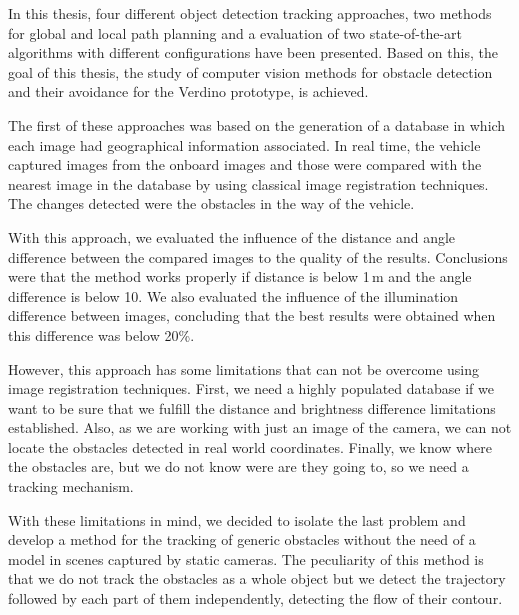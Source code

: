 

In this thesis, four different object detection tracking approaches, two methods for global and local path planning and a evaluation of two state-of-the-art algorithms with different configurations have been presented. Based on this, the goal of this thesis, the study of computer vision methods for obstacle detection and their avoidance for the Verdino prototype, is achieved.

The first of these approaches was based on the generation of a database in which each image had geographical information associated. In real time, the vehicle captured images from the onboard images and those were compared with the nearest image in the database by using classical image registration techniques. The changes detected were the obstacles in the way of the vehicle. 

With this approach, we evaluated the influence of the distance and angle difference between the compared images to the quality of the results. Conclusions were that the method works properly if distance is below 1\,m and the angle difference is below 10\textdegree. We also evaluated the influence of the illumination difference between images, concluding that the best results were obtained when this difference was below 20\%.

However, this approach has some limitations that can not be overcome using image registration techniques. First, we need a highly populated database if we want to be sure that we fulfill the distance and brightness difference limitations established. Also, as we are working with just an image of the camera, we can not locate the obstacles detected in real world coordinates. Finally, we know where the obstacles are, but we do not know were are they going to, so we need a tracking mechanism.

With these limitations in mind, we decided to isolate the last problem and develop a method for the tracking of generic obstacles without the need of a model in scenes captured by static cameras. The peculiarity of this method is that we do not track the obstacles as a whole object but we detect the trajectory followed by each part of them independently, detecting the flow of their contour.

